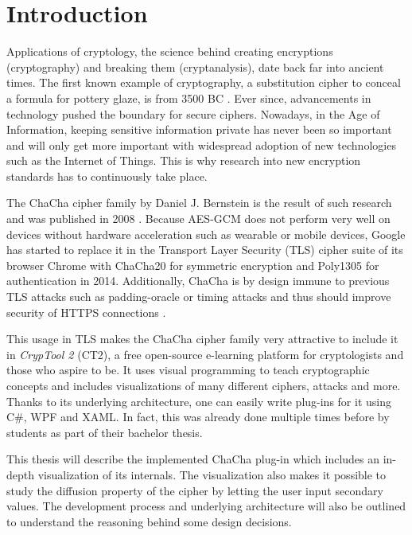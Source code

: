 
\chapter{Introduction}

Applications of cryptology, the science behind creating encryptions (cryptography) and breaking them (cryptanalysis), date back far into ancient times. The first known example of  cryptography, a substitution cipher to conceal a formula for pottery glaze, is from 3500 BC \cite{history}. Ever since, advancements in technology pushed the boundary for secure ciphers. Nowadays, in the Age of Information, keeping sensitive information private has never been so important and will only get more important with widespread adoption of new technologies such as the Internet of Things. This is why research into new encryption standards has to continuously take place.

The ChaCha cipher family by Daniel J. Bernstein is the result of such research and was published in 2008 \cite{chachaspec}. Because AES-GCM does not perform very well on devices without hardware acceleration such as wearable or mobile devices, Google has started to replace it in the Transport Layer Security (TLS) cipher suite of its browser Chrome with ChaCha20 for symmetric encryption and Poly1305 for authentication in 2014. Additionally, ChaCha is by design immune to previous TLS attacks such as padding-oracle or timing attacks and thus should improve security of HTTPS connections \cite{googlesecurityblog}.

This usage in TLS makes the ChaCha cipher family very attractive to include it in \textit{CrypTool 2} (CT2), a free open-source e-learning platform for cryptologists and those who aspire to be. It uses visual programming to teach cryptographic concepts and includes visualizations of many different ciphers, attacks and more. Thanks to its underlying architecture, one can easily write plug-ins for it using C\#, WPF and XAML. In fact, this was already done multiple times before by students as part of their bachelor thesis.

This thesis will describe the implemented ChaCha plug-in which includes an in-depth visualization of its internals. The visualization also makes it possible to study the diffusion property of the cipher by letting the user input secondary values. The development process and underlying architecture will also be outlined to understand the reasoning behind some design decisions.